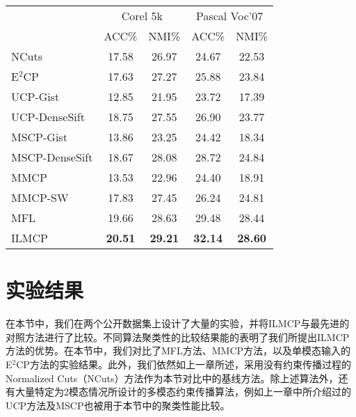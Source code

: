 \begin{table}[h]
	\label{tab4:2modal_notag}
	
	\centering
	\setlength{\tabcolsep}{15pt}
	\begin{tabular}{lcccc}
		\toprule
		&\multicolumn{2}{c}{Corel 5k} & \multicolumn{2}{c}{Pascal Voc'07} \\
		\cmidrule(lr){2-3}
		\cmidrule(lr){4-5}
		& ACC\% & NMI\% & ACC\% & NMI\% \\
		\midrule
		NCuts\cite{shi2000normalized} & 17.58 & 26.97 & 24.67 & 22.53 \\ 
		E$^2$CP\cite{lu2010constrained} & 17.63 & 27.27 & 25.88 & 23.84 \\ 
		UCP-Gist\cite{lu2013unified} & 12.85 & 21.95 & 23.72 & 17.39 \\ 
		UCP-DenseSift\cite{lu2013unified} & 18.75 & 27.55 & 26.90 & 23.77 \\ 
		MSCP-Gist\cite{lu2013exhaustive} & 13.86 & 23.25 & 24.42 & 18.34 \\ 
		MSCP-DenseSift\cite{lu2013exhaustive} & 18.67 & 28.08 & 28.72 & 24.84 \\ 
		MMCP\cite{fu2011multi} & 13.53 & 22.96 & 24.40 & 18.91 \\ 
		MMCP-SW\cite{fu2011multi} & 17.83 & 27.45 & 26.24 & 24.81 \\ 
		MFL & 19.66 & 28.63 & 29.48 & 28.44 \\ 
		ILMCP & \textbf{20.51} & \textbf{29.21} & \textbf{32.14} & \textbf{28.60} \\ 
		\bottomrule
	\end{tabular}
\end{table}

\section{实验结果}
 在本节中，我们在两个公开数据集上设计了大量的实验，并将ILMCP与最先进的对照方法进行了比较。不同算法聚类性的比较结果能的表明了我们所提出ILMCP方法的优势。在本节中，我们对比了MFL方法、MMCP\cite{fu2011multi}方法，以及单模态输入的E$^2$CP\cite{lu2010constrained}方法的实验结果。此外，我们依然如上一章所述，采用没有约束传播过程的Normalized Cuts（NCuts）\cite{shi2000normalized}方法作为本节对比中的基线方法。除上述算法外，还有大量特定为2模态情况所设计的多模态约束传播算法，例如上一章中所介绍过的UCP\cite{lu2013unified}方法及MSCP\cite{lu2013exhaustive}也被用于本节中的聚类性能比较。

